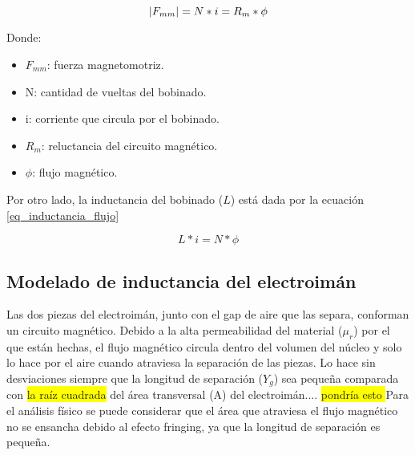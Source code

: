 



\begin{equation} \label{eq_fuerza-magnetomotriz}
	\lvert F_{mm}\rvert=N*i=R_{m}*\phi	
\end{equation}

\noindent Donde: 
\begin{itemize}
	\item $F_{mm}$: fuerza magnetomotriz.
	\item N: cantidad de vueltas del bobinado.
	\item i: corriente que circula por el bobinado.
	\item $R_{m}$: reluctancia del circuito magnético.
	\item $\phi$: flujo magnético.
\end{itemize}


\noindent Por otro lado, la inductancia del bobinado ($L$) está dada por la ecuación \ref{eq_inductancia_flujo}

\begin{equation} \label{eq_inductancia_flujo}
	L*i=N*\phi
\end{equation}

\subsection{Modelado de inductancia del electroimán}

\noindent Las dos piezas del electroimán, junto con el gap de aire que las separa, conforman un circuito magnético. Debido a la alta permeabilidad del material ($\mu_{r}$) por el que están hechas, el flujo magnético circula dentro del volumen del núcleo y solo lo hace por el aire cuando atraviesa la separación de las piezas. Lo hace sin desviaciones siempre que la longitud de separación ($Y_{g}$) sea pequeña comparada con \colorbox{yellow}{la raíz cuadrada} del área transversal (A) del electroimán.... \colorbox{yellow}{pondría esto }Para el análisis físico se puede considerar que el área que atraviesa el flujo magnético no se ensancha debido al efecto fringing, ya que la longitud de separación es pequeña.

